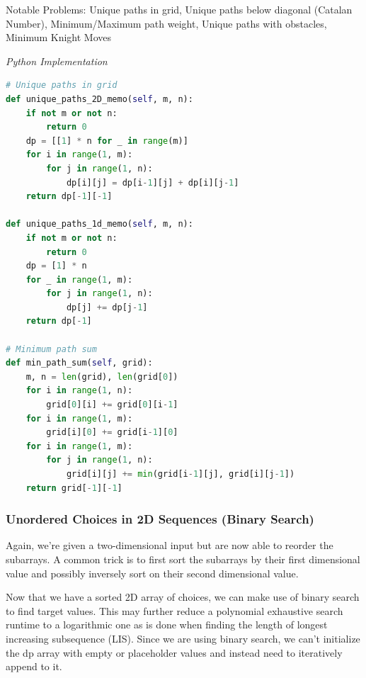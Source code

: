 \documentclass{article}
\newcommand{\comment}[1]{}
\begin{document}
Notable Problems: Unique paths in grid, Unique paths below diagonal (Catalan Number), Minimum/Maximum path weight, Unique paths with obstacles, Minimum Knight Moves

\vspace{8pt} \emph{Python Implementation}
\begin{lstlisting}[language=Python]
# Unique paths in grid
def unique_paths_2D_memo(self, m, n):
    if not m or not n:
        return 0
    dp = [[1] * n for _ in range(m)]
    for i in range(1, m):
        for j in range(1, n):
            dp[i][j] = dp[i-1][j] + dp[i][j-1]
    return dp[-1][-1]

def unique_paths_1d_memo(self, m, n):
    if not m or not n:
        return 0
    dp = [1] * n
    for _ in range(1, m):
        for j in range(1, n):
            dp[j] += dp[j-1]
    return dp[-1]
    
# Minimum path sum
def min_path_sum(self, grid):
    m, n = len(grid), len(grid[0])
    for i in range(1, n):
        grid[0][i] += grid[0][i-1]
    for i in range(1, m):
        grid[i][0] += grid[i-1][0]
    for i in range(1, m):
        for j in range(1, n):
            grid[i][j] += min(grid[i-1][j], grid[i][j-1])
    return grid[-1][-1]
\end{lstlisting}

\subsubsection*{Unordered Choices in 2D Sequences (Binary Search)}

\comment{
def bisect_left(A, val):
    lo, hi = 0, len(A) - 1
    while lo <= hi:
        mid = (lo + hi) //2
        if A[mid] < val:
            lo = mid + 1
        elif val < A[mid]:
            hi = mid - 1
        else:
            return mid
    return lo
}
Again, we're given a two-dimensional input but are now able to reorder the subarrays. A common trick is to first sort the subarrays by their first dimensional value and possibly inversely sort on their second dimensional value. 

Now that we have a sorted 2D array of choices, we can make use of binary search to find target values. This may further reduce a polynomial exhaustive search runtime to a logarithmic one as is done when finding the length of longest increasing subsequence (LIS). Since we are using binary search, we can't initialize the dp array with empty or placeholder values and instead need to iteratively append to it. 
\end{document}
